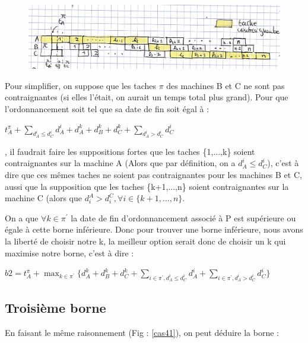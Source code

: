 \documentclass[12pt]{article}
\begin{document}
\begin{figure}[!ht]
\centering
\centerline{\includegraphics[scale=1]{10.jpg}}
\caption{}
\label{cas31}
\end{figure}

Pour simplifier, on suppose que les taches $\pi$ des machines B et C ne sont pas contraignantes (si elles l'était, on aurait un temps total plus grand). Pour que l'ordonnancement soit tel que sa date de fin soit égal à :\\
\begin{center}
$t_A^\pi + \displaystyle\sum_{d_A^i \le d_C^i}d_A^i + d_A^k + d_B^k + d_C^k + \displaystyle\sum_{d_A^i > d_C^i}d_C^i$\\
\end{center}
, il faudrait faire les suppositions fortes que les taches \{1,...,k\} soient contraignantes sur la machine A (Alors que par définition, on a $d_A^i \le d_C^i$), c'est à dire que ces mêmes taches ne soient pas contraignantes pour les machines B et C, aussi que la supposition que les taches \{k+1,...,n\} soient contraignantes sur la machine C (alors que $d_i^A > d_i^C, \forall i \in \{k+1,...,n\}$.

On a que $\forall k \in \pi^\prime$ la date de fin d'ordonnancement associé à P est supérieure ou égale à cette borne inférieure. Donc pour trouver une borne inférieure, nous avons la liberté de choisir notre k, la meilleur option serait donc de choisir un k qui maximise notre borne, c'est à dire :\\
\begin{center}
 $b2 = t_A^\pi + \displaystyle\max_{k \in \pi^\prime}\{d_A^k + d_B^k + d_C^k + \displaystyle\sum_{i \in \pi^\prime,d_A^i \le d_C^i} d_A^i + \displaystyle\sum_{i \in \pi^\prime,d_A^i > d_C^i} d_C^i\} $\\
\end{center}
\subsection{Troisième borne}

En faisant le même raisonnement (Fig : \ref{cas41}), on peut déduire la borne :\\
\end{document}
